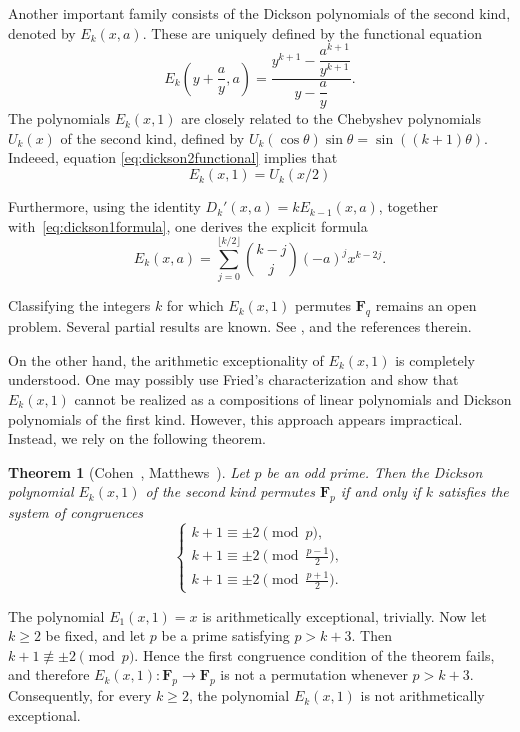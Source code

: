 \documentclass{amsart}
\newcommand{\F}{\mathbf F}
\numberwithin{equation}{section}
\theoremstyle{plain}
\newtheorem{theorem}{Theorem}
\theoremstyle{definition}
\begin{document}
Another important family consists of the Dickson polynomials of the second kind, denoted by $E_k(x,a)$. These are uniquely defined by the functional equation
\begin{equation}\label{eq:dickson2functional}
	E_k\left(y+\frac{a}{y},a\right)
	=
	\frac{y^{k+1}-\dfrac{a^{k+1}}{y^{k+1}}}
	{y-\dfrac{a}{y}}.
\end{equation}
The polynomials $E_k(x,1)$ are closely related to the Chebyshev polynomials $U_k(x)$ of the second kind, defined by $U_k(\cos\theta) \sin\theta = \sin((k+1)\theta)$. Indeeed, equation \eqref{eq:dickson2functional} implies that
\[E_k(x,1)=U_k(x/2)\]

Furthermore, using the identity $D_k'(x,a)=kE_{k-1}(x,a)$, together with~\eqref{eq:dickson1formula}, one derives the explicit formula
\begin{equation*}\label{eq:dickson2formula}
	E_k(x,a)
	=
	\sum_{j=0}^{\lfloor k/2\rfloor}
	\binom{k-j}{j}
	(-a)^j x^{k-2j}.
\end{equation*}

Classifying the integers $k$ for which $E_k(x,1)$ permutes $\F_q$ remains an open problem. Several partial results are known. See \cite{HendersonMatthews, PanarioLima}, and the references therein.

On the other hand, the arithmetic exceptionality of $E_k(x,1)$ is completely understood. One may possibly use Fried's characterization \cite{fried1970} and show that $E_k(x,1)$ cannot be realized as a compositions of linear polynomials and Dickson polynomials of the first kind. However, this approach appears impractical. Instead, we rely on the following theorem.

\begin{theorem}[Cohen~\cite{cohen1994}, Matthews~\cite{matthews1982}]\label{thm:CohenMatt}
	Let $p$ be an odd prime. Then the Dickson polynomial $E_k(x,1)$ of the second kind permutes $\F_p$ if and only if $k$ satisfies the system of congruences
	\[
	\begin{cases}
		k+1\equiv \pm2 \pmod p,\\
		k+1\equiv \pm2 \pmod{\frac{p-1}{2}},\\
		k+1\equiv \pm2 \pmod{\frac{p+1}{2}}.
	\end{cases}
	\]
\end{theorem}

The polynomial $E_1(x,1)=x$ is arithmetically exceptional, trivially. Now let $k\ge 2$ be fixed, and let $p$ be a prime satisfying $p>k+3$. Then
$k+1\not\equiv \pm2 \pmod p$. Hence the first congruence condition of the theorem fails, and therefore $E_k(x,1):\F_p\to\F_p$ is not a permutation whenever $p>k+3$. Consequently, for every $k\ge2$, the polynomial $E_k(x,1)$ is not arithmetically exceptional.
\end{document}
